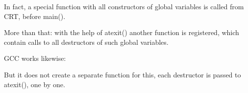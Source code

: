






In fact, a special function with all constructors of global variables is called from \ac{CRT}, before
main().

More than that: with the help of atexit() another function is registered, 
which contain calls to all destructors of such global variables.

GCC works likewise:



But it does not create a separate function for this, 
each destructor is passed to atexit(), one by one.


